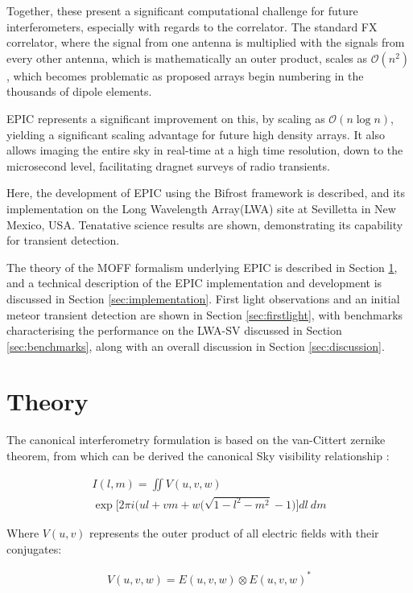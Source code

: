\documentclass[bibliography=totocnumbered, twocolumn]{article}
\begin{document}
Together, these present a significant computational challenge for
future interferometers, especially with regards to the correlator.
The standard FX correlator, where the signal from one antenna is
multiplied with the signals from every other antenna, which is
mathematically an outer product, scales as $\mathcal{O}(n^2)$,
which becomes problematic as proposed arrays begin numbering in
the thousands of dipole elements.

EPIC represents a significant improvement on this, by scaling as
$\mathcal{O}(n\log{n})$, yielding a significant scaling advantage
for future high density arrays. It also allows imaging the entire
sky in real-time at a high time resolution, down to the microsecond
level, facilitating dragnet surveys of radio transients.

Here, the development of EPIC using the Bifrost framework is
described, and its implementation on the Long Wavelength Array(LWA)
site at Sevilletta in New Mexico, USA. Tenatative science results
are shown, demonstrating its capability for transient detection.

The theory of the MOFF formalism underlying EPIC is described in 
Section \ref{sec:theory}, and a technical description of the
EPIC implementation and development is discussed in Section
\ref{sec:implementation}. First light observations and an initial
meteor transient detection are shown in Section \ref{sec:firstlight},
with benchmarks characterising the performance on the LWA-SV discussed
in Section \ref{sec:benchmarks}, along with an overall discussion in
Section \ref{sec:discussion}.

\section{Theory} \label{sec:theory}

The canonical interferometry formulation is based on the van-Cittert
zernike theorem, from which can be derived the canonical Sky
visibility relationship
\citep{born_principles_1999}\citep{ryle_synthesis_1960}:

\begin{multline} \label{eq:vc}
 I(l,m) = \iint V(u,v,w) \\ \exp\bigg[2\pi i \big(ul + vm + w\big(\sqrt{1-l^2-m^2}-1\big)\bigg]dl\: dm
\end{multline}

Where $V(u,v)$ represents the outer product of all electric fields
with their conjugates:

\begin{align} \label{eq:vis}
  V(u,v,w) = E(u,v,w) \otimes E(u,v,w)^{\ast}
\end{align}
\end{document}
